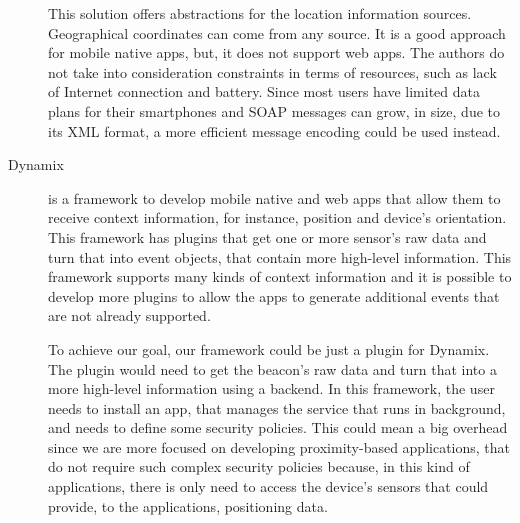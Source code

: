 \begin{description}
  This solution offers abstractions for the location
  information sources. Geographical coordinates can
  come from any source. It is a good approach for
  mobile native apps, but, it does not support web apps.
  The authors do not take into consideration
  constraints in terms of resources, such as
  lack of Internet connection and battery.
  Since most users have limited data plans for
  their smartphones and \gls{SOAP} messages can
  grow, in size, due to its \gls{XML} format,
  a more efficient message encoding could be used
  instead.
  \item[Dynamix\cite{Carlson2012}]
  is a framework to develop
  mobile native and web apps that allow them to receive
  context information, for instance, position and device's
  orientation. This framework has plugins that get
  one or more sensor's raw data and turn that into event
  objects, that contain more high-level information.
  This framework supports many kinds of context information
  and it is possible to develop more plugins to allow the
  apps to generate additional events that are not
  already supported.

  To achieve our goal, our framework could be just a
  plugin for Dynamix. The plugin would
  need to get the beacon's raw data and
  turn that into a more high-level information
  using a backend. In this framework,
  the user needs to install an app, that manages the service
  that runs in background, and needs to define some
  security policies. This could mean a big overhead since
  we are more focused on developing proximity-based applications, that do not require such complex security
  policies because, in this kind of applications, there is only need
  to access the device's sensors that could provide,
  to the applications, positioning data.
\end{description}
